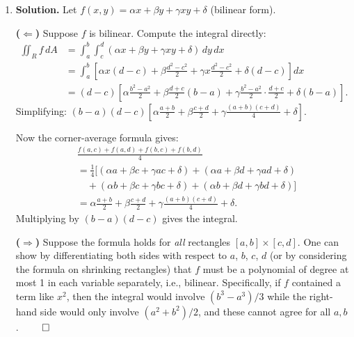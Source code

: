 \begin{enumerate}
\textbf{Step 2:} Integrate with respect to $y$:
\[
\int\!\left(\frac{3x^2}{2} + x^2 y^2 + g(y)\right)dy = \frac{3x^2 y}{2} + \frac{x^2 y^3}{3} + G(y) + h(x),
\]
where $G(y) = \int g(y)\,dy$ is arbitrary and $h(x)$ is an arbitrary function of $x$.

In the requested form:
\[
\boxed{F(x,y) + G(y) + h(x) \;=\; \frac{3x^2 y}{2} + \frac{x^2 y^3}{3} + G(y) + h(x)}.
\]

\item \textbf{Solution.}
Let $f(x,y) = \alpha x + \beta y + \gamma xy + \delta$ (bilinear form).

\textbf{($\Leftarrow$)} Suppose $f$ is bilinear. Compute the integral directly:
\begin{align*}
\iint_R f\,dA &= \int_a^b\int_c^d (\alpha x + \beta y + \gamma xy + \delta)\,dy\,dx \\
&= \int_a^b\left[\alpha x(d-c)+\beta\frac{d^2-c^2}{2}+\gamma x\frac{d^2-c^2}{2}+\delta(d-c)\right]dx \\
&= (d-c)\left[\alpha\frac{b^2-a^2}{2}+\beta\frac{d+c}{2}(b-a)+\gamma\frac{b^2-a^2}{2}\cdot\frac{d+c}{2}+\delta(b-a)\right].
\end{align*}
Simplifying: $(b-a)(d-c)\left[\alpha\frac{a+b}{2}+\beta\frac{c+d}{2}+\gamma\frac{(a+b)(c+d)}{4}+\delta\right]$.

Now the corner-average formula gives:
\begin{align*}
&\frac{f(a,c)+f(a,d)+f(b,c)+f(b,d)}{4} \\
&= \frac{1}{4}\bigl[(\alpha a+\beta c+\gamma ac+\delta)+(\alpha a+\beta d+\gamma ad+\delta)\\
&\quad+(\alpha b+\beta c+\gamma bc+\delta)+(\alpha b+\beta d+\gamma bd+\delta)\bigr]\\
&= \alpha\frac{a+b}{2}+\beta\frac{c+d}{2}+\gamma\frac{(a+b)(c+d)}{4}+\delta.
\end{align*}
Multiplying by $(b-a)(d-c)$ gives the integral.

\textbf{($\Rightarrow$)} Suppose the formula holds for \emph{all} rectangles $[a,b]\times[c,d]$. One can show by differentiating both sides with respect to $a$, $b$, $c$, $d$ (or by considering the formula on shrinking rectangles) that $f$ must be a polynomial of degree at most 1 in each variable separately, i.e., bilinear. Specifically, if $f$ contained a term like $x^2$, then the integral would involve $(b^3-a^3)/3$ while the right-hand side would only involve $(a^2+b^2)/2$, and these cannot agree for all $a,b$. $\qed$


\end{enumerate}
